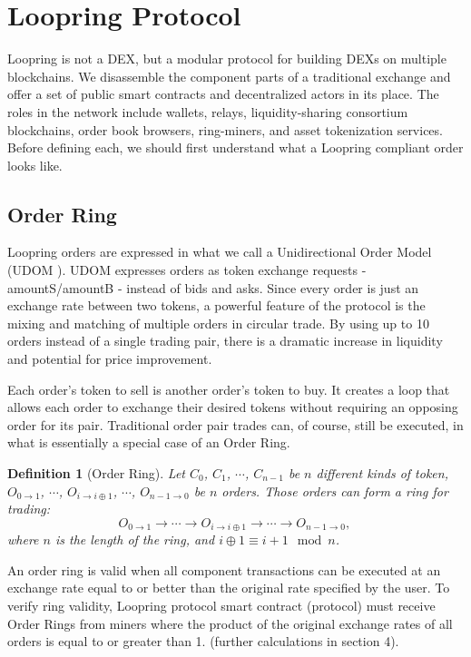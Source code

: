 \documentclass[UTF8,nofonts]{article}
\newtheorem{definition}{Definition}[section]
\begin{document}
\section{Loopring Protocol\label{sec:loopring_protocol}}
Loopring is not a DEX, but a modular protocol for building DEXs on multiple blockchains. We disassemble the component parts of a traditional exchange and offer a set of public smart contracts and decentralized actors in its place. The roles in the network include wallets, relays, liquidity-sharing consortium blockchains, order book browsers, ring-miners, and asset tokenization services. Before defining each, we should first understand what a Loopring compliant order looks like. 

\subsection{Order Ring}
Loopring orders are expressed in what we call a Unidirectional Order Model (UDOM \cite{coinport2014udom}). UDOM expresses orders as token exchange requests - amountS/amountB - instead of bids and asks. Since every order is just an exchange rate between two tokens, a powerful feature of the protocol is the mixing and matching of multiple orders in circular trade. By using up to 10 orders instead of a single trading pair, there is a dramatic increase in liquidity and potential for price improvement. 

Each order's token to sell is another order's token to buy. It creates a loop that allows each order to exchange their desired tokens without requiring an opposing order for its pair. Traditional order pair trades can, of course, still be executed, in what is essentially a special case of an Order Ring. 


\begin{definition}[Order Ring] Let $C_{0}$, $C_{1}$, $\cdots$, $C_{n-1}$ be $n$ different kinds of token, $O_{0\rightarrow 1}$, $\cdots$, $O_{i\rightarrow i\oplus 1}$, $\cdots$, $O_{n-1 \rightarrow 0}$ be $n$ orders. Those orders can form a ring for trading:
$$O_{0\rightarrow 1} \rightarrow \cdots \rightarrow O_{i\rightarrow i\oplus 1} \rightarrow \cdots \rightarrow O_{n-1\rightarrow 0} \text{, }$$
where $n$ is the length of the ring, and $i\oplus 1 \equiv i+1 \mod n$.
\end{definition}

An order ring is valid when all component transactions can be executed at an exchange rate equal to or better than the original rate specified by the user. To verify ring validity, Loopring protocol smart contract (protocol) must receive Order Rings from miners where the product of the original exchange rates of all orders is equal to or greater than 1. (further calculations in section 4).
\end{document}
